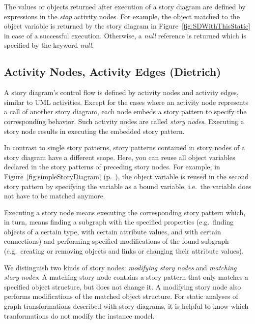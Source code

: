 The values or objects returned after execution of a story diagram are defined by expressions in the \emph{stop} activity nodes.
For example, the object matched to the object variable  is returned by the story diagram in Figure~\ref{fig:SDWithThisStatic} in case of a successful execution.
Otherwise, a \emph{null} reference is returned which is specified by the keyword \emph{null}.


\subsection{Activity Nodes, Activity Edges (Dietrich)} \label{sec:storydiagrams:activitynodes}

A story diagram's control flow is defined by activity nodes and activity edges, similar to UML activities.
Except for the cases where an activity node represents a call of another story diagram,
each node embeds a story pattern to specify the corresponding behavior.
Such activity nodes are called \emph{story nodes}.
Executing a story node results in executing the embedded story pattern.

In contrast to single story patterns, story patterns contained in story nodes of a story diagram have a different scope.
Here, you can reuse all object variables declared in the story patterns of preceding story nodes.
For example, in Figure~\ref{fig:simpleStoryDiagram} (p.~\pageref{fig:simpleStoryDiagram}),
the object variable  is reused in the second story pattern
by specifying the variable as a bound variable, i.e.\ the variable does not have to be matched anymore.

Executing a story node means executing the corresponding story pattern
which, in turn, means finding a subgraph with the specified properties
(e.g.\ finding objects of a certain type, with certain attribute values, and with certain connections)
and performing specified modifications of the found subgraph
(e.g.\ creating or removing objects and links or changing their attribute values).

We distinguish two kinds of story nodes: \emph{modifying story nodes} and \emph{matching story nodes}.
A matching story node contains a story pattern that only matches a specified object structure, but does not change it.
A modifying story node also performs modifications of the matched object structure.
For static analyses of graph transformations described with story diagrams,
it is helpful to know which tranformations do not modify the instance model.


